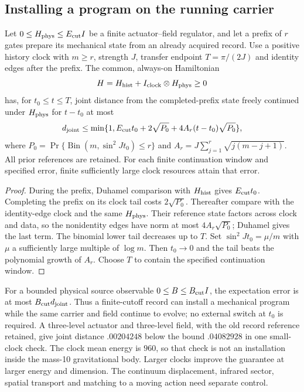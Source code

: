\subsection{Installing a program on the running carrier}

\begin{proposition}
\label{prop:inertial-installation}
Let $0\le H_{\rm phys}\le E_{\rm cut}I$ be a finite actuator--field
regulator, and let a prefix of $r$ gates prepare its mechanical state
from an already acquired record. Use a positive history clock with
$m\ge r$, strength $J$, transfer endpoint $T=\pi/(2J)$ and identity
edges after the prefix. The common, always-on Hamiltonian
\begin{equation}\label{eq:inertial-installation-H}
 H=H_{\rm hist}+I_{\rm clock}\otimes H_{\rm phys}\ge0
\end{equation}
has, for $t_0\le t\le T$, joint distance from the completed-prefix
state freely continued under $H_{\rm phys}$ for $t-t_0$ at most
\begin{equation}\label{eq:inertial-installation-bound}
 d_{\rm joint}\le\min\{1,E_{\rm cut}t_0+2\sqrt{P_0}
                     +4A_r(t-t_0)\sqrt{P_0}\},
\end{equation}
where $P_0=\Pr\{\operatorname{Bin}(m,\sin^2Jt_0)\le r\}$ and
$A_r=J\sum_{j=1}^r\sqrt{j(m-j+1)}$. All prior references are retained.
For each finite continuation window and specified error, finite
sufficiently large clock resources attain that error.
\end{proposition}
\begin{proof}
During the prefix, Duhamel comparison with $H_{\rm hist}$ gives
$E_{\rm cut}t_0$. Completing the prefix on its clock tail costs
$2\sqrt{P_0}$. Thereafter compare with the identity-edge clock and
the same $H_{\rm phys}$. Their reference state factors across clock
and data, so the nonidentity edges have norm at most
$4A_r\sqrt{P_0}$; Duhamel gives the last term. The binomial lower
tail decreases up to $T$. Set $\sin^2Jt_0=\mu/m$ with $\mu$ a
sufficiently large multiple of $\log m$. Then $t_0\to0$ and the tail
beats the polynomial growth of $A_r$. Choose $T$ to contain the
specified continuation window.
\end{proof}

For a bounded physical source observable $0\le B\le B_{\rm cut}I$,
the expectation error is at most $B_{\rm cut}d_{\rm joint}$. Thus a
finite-cutoff record can install a mechanical program while the same
carrier and field continue to evolve; no external switch at $t_0$ is
required. A three-level actuator and three-level field, with the old
record reference retained, give joint distance $.00204248$ below the
bound $.04082928$ in one small-clock check. The clock mean energy is
$960$, so that check is not an installation inside the mass-10
gravitational body. Larger clocks improve the guarantee at larger
energy and dimension. The continuum displacement, infrared sector,
spatial transport and matching to a moving action need separate control.

